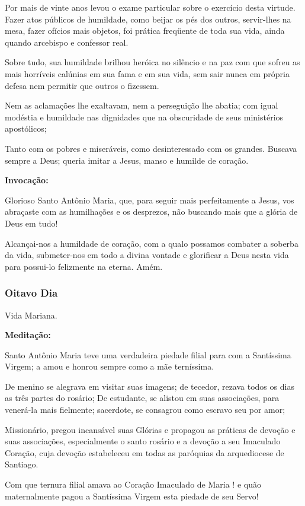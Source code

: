 \documentclass[a4paper,14pt]{extarticle} \usepackage[utf8]{inputenc}
\begin{document}
Por mais de vinte anos levou o exame particular sobre o exercício desta virtude. Fazer atos públicos de humildade, como beijar os pés dos outros, servir-lhes na mesa, fazer ofícios mais objetos, foi prática freqüente de toda sua vida, ainda quando arcebispo e confessor real.

Sobre tudo, sua humildade brilhou heróica no silêncio e na paz com que sofreu as mais horríveis calúnias em sua fama e em sua vida, sem sair nunca em própria defesa nem permitir que outros o fizessem.

Nem as aclamações lhe exaltavam, nem a perseguição lhe abatia; com igual modéstia e humildade nas dignidades que na obscuridade de seus ministérios apostólicos;

Tanto com os pobres e miseráveis, como desinteressado com os grandes. Buscava sempre a Deus; queria imitar a Jesus, manso e humilde de coração.

\textbf{Invocação:}

Glorioso Santo Antônio Maria, que, para seguir mais perfeitamente a Jesus, vos abraçaste com as humilhações e os desprezos, não buscando mais que a glória de Deus em tudo!

Alcançai-nos a humildade de coração, com a qualo possamos combater a soberba da vida, submeter-nos em todo a divina vontade e glorificar a Deus nesta vida para possui-lo felizmente na eterna. Amém.

\subsubsection{Oitavo Dia}
Vida Mariana.

\textbf{Meditação:}

Santo Antônio Maria teve uma verdadeira piedade filial para com a Santíssima Virgem; a amou e honrou sempre como a mãe terníssima.

De menino se alegrava em visitar suas imagens; de tecedor, rezava todos os dias as três partes do rosário; De estudante, se alistou em suas associações, para venerá-la mais fielmente; sacerdote, se consagrou como escravo seu por amor;

Missionário, pregou incansável suas Glórias e propagou as práticas de devoção e suas associações, especialmente o santo rosário e a devoção a seu Imaculado Coração, cuja devoção estabeleceu em todas as paróquias da arquediocese de Santiago.

Com que ternura filial amava ao Coração Imaculado de Maria ! e quão maternalmente pagou a Santíssima Virgem esta piedade de seu Servo!
\end{document}
